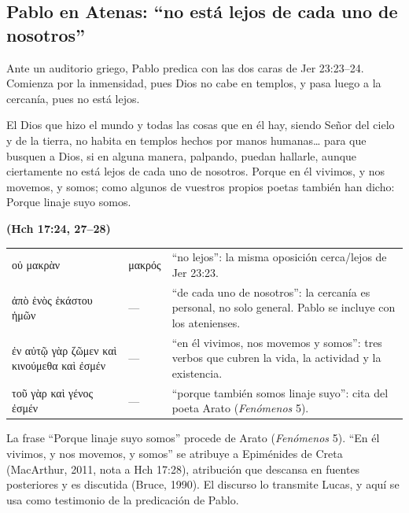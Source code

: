 \documentclass[11pt,letterpaper]{article}
\newcommand{\grc}[1]{\foreignlanguage{ancientgreek}{#1}}
\newcommand{\fuente}[1]{\par\hfill{\upshape\bfseries\small\textcolor{azul}{#1}}}
\begin{document}
\subsection{Pablo en Atenas: ``no está lejos de cada uno de nosotros''}

Ante un auditorio griego, Pablo predica con las dos caras de Jer 23:23--24. Comienza por la inmensidad, pues Dios no cabe en templos, y pasa luego a la cercanía, pues no está lejos.

\begin{cita}El Dios que hizo el mundo y todas las cosas que en él hay, siendo Señor del cielo y de la tierra, no habita en templos hechos por manos humanas\ldots{} para que busquen a Dios, si en alguna manera, palpando, puedan hallarle, aunque ciertamente no está lejos de cada uno de nosotros. Porque en él vivimos, y nos movemos, y somos; como algunos de vuestros propios poetas también han dicho: Porque linaje suyo somos.\fuente{(Hch 17:24, 27--28)}\end{cita}

\begin{filologia}[Hch 17:27--28]
\begin{tabular}{@{}L{3.6cm}L{1.6cm}L{9.6cm}@{}}
\grc{οὐ μακρὰν} & \grc{μακρός} & ``no lejos'': la misma oposición cerca/lejos de Jer 23:23. \\[2pt]
\grc{ἀπὸ ἑνὸς ἑκάστου ἡμῶν} & --- & ``de cada uno de nosotros'': la cercanía es personal, no solo general. Pablo se incluye con los atenienses. \\[2pt]
\grc{ἐν αὐτῷ γὰρ ζῶμεν καὶ κινούμεθα καὶ ἐσμέν} & --- & ``en él vivimos, nos movemos y somos'': tres verbos que cubren la vida, la actividad y la existencia. \\[2pt]
\grc{τοῦ γὰρ καὶ γένος ἐσμέν} & --- & ``porque también somos linaje suyo'': cita del poeta Arato (\emph{Fenómenos} 5). \\
\end{tabular}
\end{filologia}

\begin{nota}[Precisión]
La frase ``Porque linaje suyo somos'' procede de Arato (\emph{Fenómenos} 5). ``En él vivimos, y nos movemos, y somos'' se atribuye a Epiménides de Creta (MacArthur, 2011, nota a Hch 17:28), atribución que descansa en fuentes posteriores y es discutida (Bruce, 1990). El discurso lo transmite Lucas, y aquí se usa como testimonio de la predicación de Pablo.
\end{nota}
\end{document}
